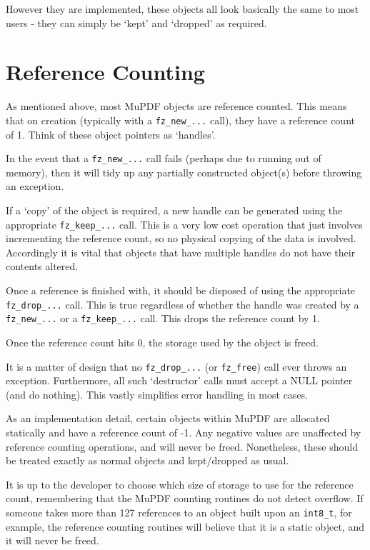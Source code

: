 \documentclass[oneside]{book}
\begin{document}
However they are implemented, these objects all look basically the same to most users - they can simply be `kept' and `dropped' as required.

\section{Reference Counting}
\label{ReferenceCounting}

As mentioned above, most MuPDF objects are reference counted. This means that on  creation (typically with a \texttt{fz\_new\_...} call), they have a reference count of 1. Think of these object pointers as `handles'.

In the event that a \texttt{fz\_new\_...} call fails (perhaps due to running out of memory), then it will tidy up any partially constructed object(s) before throwing an exception.

If a `copy' of the object is required, a new handle can be generated using the appropriate \texttt{fz\_keep\_...} call. This is a very low cost operation that just involves incrementing the reference count, so no physical copying of the data is involved. Accordingly it is vital that objects that have multiple handles do not have their contents altered.

Once a reference is finished with, it should be disposed of using the appropriate \texttt{fz\_drop\_...} call. This is true regardless of whether the handle was created by a \texttt{fz\_new\_...} or a \texttt{fz\_keep\_...} call. This drops the reference count by 1.

Once the reference count hits 0, the storage used by the object is freed.

It is a matter of design that no \texttt{fz\_drop\_...} (or \texttt{fz\_free}) call ever throws an exception. Furthermore, all such `destructor' calls must accept a NULL pointer (and do nothing). This vastly simplifies error handling in most cases.

As an implementation detail, certain objects within MuPDF are allocated statically and have a reference count of -1. Any negative values are unaffected by reference counting operations, and will never be freed. Nonetheless, these should be treated exactly as normal objects and kept/dropped as usual.

It is up to the developer to choose which size of storage to use for the reference count, remembering that the MuPDF counting routines do not detect overflow. If someone takes more than 127 references to an object built upon an \texttt{int8\_t}, for example, the reference counting routines will believe that it is a static object, and it will never be freed.
\end{document}
